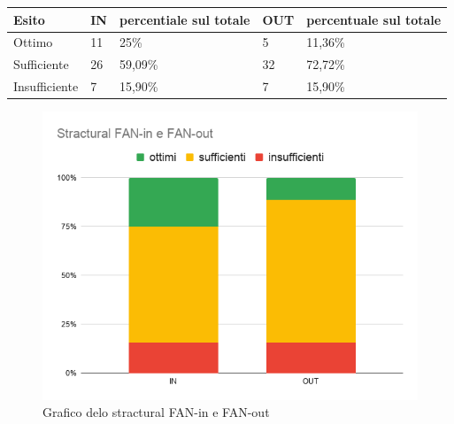    \begin{longtabu} to \textwidth {| X[0.1,c m] | X[0.1,c m] | X[0.1,c m] | X[0.1,c m] | X[0.1,c m] |}
        \hline
        \textbf{Esito} &
        \textbf{IN} &
        \textbf{percentiale sul totale} &
        \textbf{OUT} &
        \textbf{percentuale sul totale} \\
        \hline
        Ottimo & 11 & 25\% & 5 & 11,36\% \\ 
        \hline
        Sufficiente & 26 & 59,09\% & 32 & 72,72\% \\ 
        \hline
        Insufficiente & 7 & 15,90\% & 7 & 15,90\% \\ 
        \hline

        \end{longtabu}

        \begin{figure}[H]
            \centering
            \includegraphics[width=13 cm]{source/sections/images/SfinSfout.png}
            \caption{Grafico delo stractural FAN-in e FAN-out}
        \end{figure}